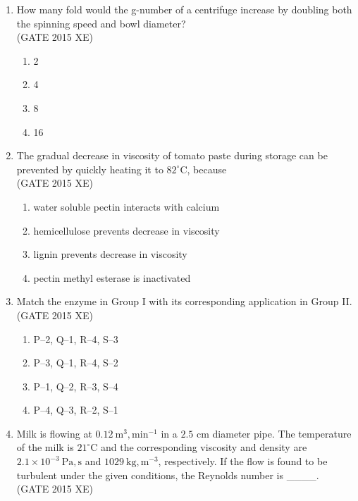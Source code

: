 \documentclass[journal,12pt,onecolumn]{IEEEtran}
\begin{document}
\begin{enumerate}
\item How many fold would the g-number of a centrifuge increase by doubling both the spinning speed and bowl diameter?\\
\hfill{(GATE 2015 XE)} 
\begin{multicols}{4}
\begin{enumerate}
\item 2
\item 4
\item 8
\item 16
\end{enumerate}
\end{multicols}

\newpage

\item The gradual decrease in viscosity of tomato paste during storage can be prevented by quickly heating it to $82^\circ$C, because\\
\hfill{(GATE 2015 XE)} 
\begin{multicols}{2}
\begin{enumerate}
\item water soluble pectin interacts with calcium
\item hemicellulose prevents decrease in viscosity
\item lignin prevents decrease in viscosity
\item pectin methyl esterase is inactivated
\end{enumerate}
\end{multicols}


\item Match the enzyme in Group I with its corresponding application in Group II.\\



\hfill{(GATE 2015 XE)} 
\begin{multicols}{2}
\begin{enumerate}
\item P–2, Q–1, R–4, S–3
\item P–3, Q–1, R–4, S–2
\item P–1, Q–2, R–3, S–4
\item P–4, Q–3, R–2, S–1
\end{enumerate}
\end{multicols}


\item Milk is flowing at $0.12\ \mathrm{m^3,min^{-1}}$ in a $2.5$ cm diameter pipe. The temperature of the milk is $21^\circ$C and the corresponding viscosity and density are $2.1\times 10^{-3}\ \mathrm{Pa,s}$ and $1029\ \mathrm{kg,m^{-3}}$, respectively. If the flow is found to be turbulent under the given conditions, the Reynolds number is \_\_\_\_.\\
\hfill{(GATE 2015 XE)} 




\end{enumerate}
\end{document}
